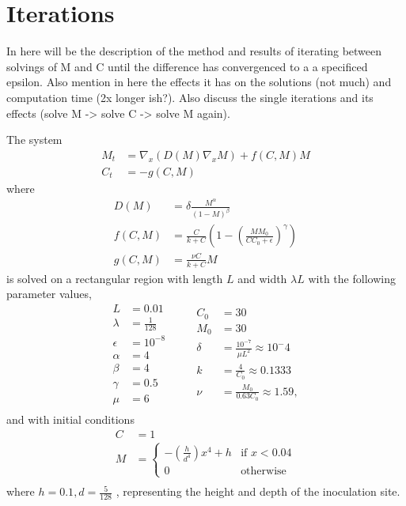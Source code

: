 \section{Iterations}

In here will be the description of the method and results of iterating between solvings of M and C until the difference has convergenced to a a specificed epsilon. Also mention in here the effects it has on the solutions (not much) and computation time (2x longer ish?). Also discuss the single iterations and its effects (solve M -> solve C -> solve M again).


  The system
  \begin{align}
    M_t &= \nabla_x \left( D(M) \nabla_x M \right) + f(C,M) M \\
    C_t &= - g(C,M) 
  \end{align}
  where
  \begin{align}
    D(M) &= \delta \frac{M^\alpha}{(1 - M)^\beta} \\
    f(C,M) &= \frac{ C }{{k } + {C}} \left(1 - \left( \frac{M M_0}{{C C_0 + \epsilon}} \right)^\gamma \right) \\
    g(C,M) &= \frac{\nu C}{k +C} M
  \end{align}
  is solved on a rectangular region with length $L$ and width $\lambda L$ with the following parameter values,
  \begin{equation}
    \begin{aligned}
      L &= 0.01 \\
      \lambda &= \frac{1}{128}\\
      \epsilon &= 10^{-8}\\
      \alpha &= 4 \\
      \beta &= 4 \\
      \gamma &= 0.5 \\
      \mu &= 6 \\      
    \end{aligned}
    \qquad
    \begin{aligned}
      C_0 &= 30 \\
      M_0 &= 30 \\
      \delta &= \frac{10^{-7}}{\mu L^2} \approx 10^-4\\
      k &= \frac{4}{C_0} \approx 0.1333\\
      \nu &= \frac{M_0}{0.63 C_0} \approx 1.59,\\
    \end{aligned}
  \end{equation}
  and with initial conditions 
  \begin{equation}
    \begin{aligned}
      C &= 1 \\
      M &= \begin{cases} -(\frac{h}{d^4})x^4 + h & \text{if } x < 0.04 \\ 0 & \text{otherwise }\end{cases} \\
    \end{aligned}
  \end{equation}  
  where $h = 0.1, d=\frac{5}{128}$ , representing the height and depth of the inoculation site.

